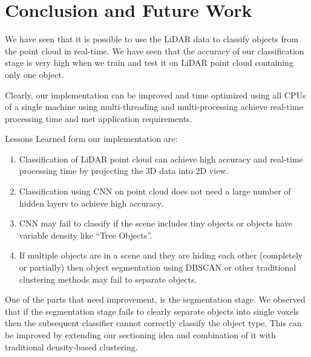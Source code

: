 \section{Conclusion and Future Work}\label{sec:conclusion}
We have seen that it is possible to use the LiDAR data to classify objects from the point cloud in real-time.
We have seen that the accuracy of our classification stage is very high when we train and test it on LiDAR point cloud containing only one object.


Clearly, our implementation can be improved and time optimized using all CPUs of a single machine using multi-threading and multi-processing achieve real-time processing time and met application requirements.


Lessons Learned form our implementation are:

\begin{enumerate}
  \item Classification of LiDAR point cloud can achieve high accuracy and real-time processing time by projecting the 3D data into 2D view.
  \item Classification using CNN on point cloud does not need a large number of hidden layers to achieve high accuracy.
  \item CNN may fail to classify if the scene includes tiny objects or objects have variable density like ``Tree Objects''.
  \item If multiple objects are in a scene and they are hiding each other (completely or partially) then object segmentation using DBSCAN or other traditional clustering methods may fail to separate objects.
\end{enumerate}

One of the parts that need improvement, is the segmentation stage. We observed that if the segmentation stage fails to clearly separate objects into single voxels then the subsequent classifier cannot correctly classify the object type. This can be improved by extending our sectioning idea and combination of it with traditional density-based clustering.
